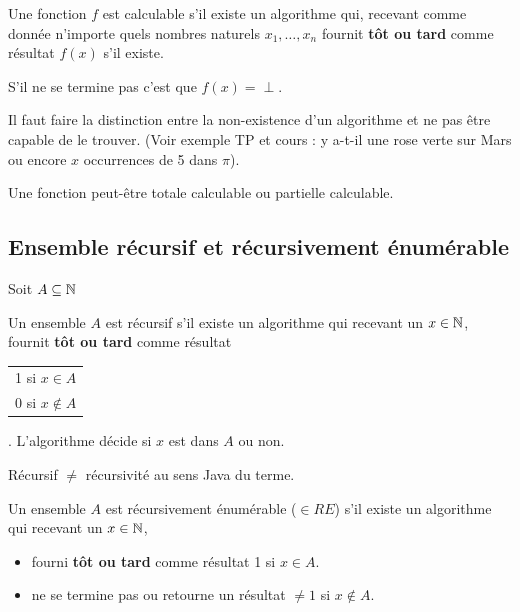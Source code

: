 \begin{mydef}
	Une fonction $f$ est calculable s’il existe un algorithme qui, recevant comme donnée
	n'importe quels nombres naturels $x_1,\ldots,x_n$ fournit \textbf{tôt ou tard} comme
	résultat $f(x)$ s’il existe.
\end{mydef}

S'il ne se termine pas c'est que $f(x)=\perp$.

\begin{myrem}
	Il faut faire la distinction entre la non-existence d'un algorithme
	et ne pas être capable de le trouver.
    (Voir exemple TP et cours : y a-t-il une rose verte sur Mars
    ou encore $x$ occurrences de 5 dans $\pi$).
\end{myrem}

\begin{myrem}
	Une fonction peut-être totale calculable ou partielle calculable.
\end{myrem}


\subsection{Ensemble récursif et récursivement énumérable}
\label{sub:ensemble_r_cursif_et_r_cursivement_num_rable}
Soit $A\subseteq \mathbb{N}$

\begin{mydef} \label{def:recursif}
	Un ensemble $A$ est récursif s'il existe un algorithme qui recevant un $x\in \mathbb{N}$,
	fournit \textbf{tôt ou tard} comme résultat
	\begin{tabular}{l}
		1 si $x\in A$\\
		0 si $x\notin A$\\
	\end{tabular}
	. L'algorithme décide si $x$ est dans $A$ ou non.
\end{mydef}

\begin{myrem}
	Récursif $\neq$ récursivité au sens Java du terme.
\end{myrem}

\begin{mydef} \label{def:recursivement enum}
	Un ensemble $A$ est récursivement énumérable ($\in RE$) s’il existe un algorithme qui recevant
	un $x\in \mathbb{N}$,
    \begin{itemize}
      \item fourni \textbf{tôt ou tard} comme résultat 1 si $x\in A$.
      \item ne se termine pas ou retourne un résultat $\neq1$ si $x \notin A$.
	\end{itemize}
\end{mydef}

